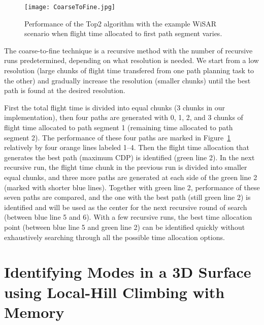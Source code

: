 

\begin{figure}
\centering
\texttt{[image: CoarseToFine.jpg]}
\caption[Performance of the Top2 algorithm when flight time allocated varies]{Performance of the Top2 algorithm with the example WiSAR scenario when flight time allocated to first path segment varies.}
\label{CoarseToFine}
\end{figure}

The coarse-to-fine technique is a recursive method with the number of recursive runs predetermined, depending on what resolution is needed. We start from a low resolution (large chunks of flight time transfered from one path planning task to the other) and gradually increase the resolution (smaller chunks) until the best path is found at the desired resolution. 

First the total flight time is divided into equal chunks (3 chunks in our implementation), then four paths are generated with 0, 1, 2, and 3 chunks of flight time allocated to path segment 1 (remaining time allocated to path segment 2). The performance of these four paths are marked in Figure~\ref{CoarseToFine} relatively by four orange lines labeled 1--4. Then the flight time allocation that generates the best path (maximum CDP) is identified (green line 2). In the next recursive run, the flight time chunk in the previous run is divided into smaller equal chunks, and three more paths are generated at each side of the green line 2 (marked with shorter blue lines). Together with green line 2, performance of these seven paths are compared, and the one with the best path (still green line 2) is identified and will be used as the center for the next recursive round of search (between blue line 5 and 6). With a few recursive runs, the best time allocation point (between blue line 5 and green line 2) can be identified quickly without exhaustively searching through all the possible time allocation options.




\chapter{Identifying Modes in a 3D Surface using Local-Hill Climbing with Memory}
\label{chap:modes}


